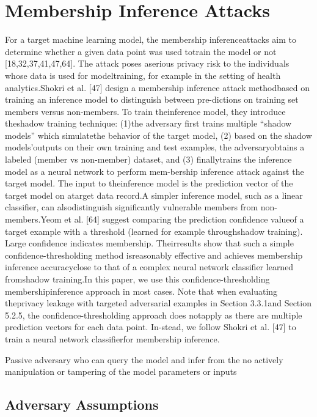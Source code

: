 \section{Membership Inference Attacks}\label{inferenceback}

For a target machine learning model, the membership inferenceattacks aim to determine whether a given data point was used totrain the model or not [18,32,37,41,47,64]. The attack poses aserious privacy risk to the individuals whose data is used for modeltraining, for example in the setting of health analytics.Shokri et al. [47] design a membership inference attack methodbased on training an inference model to distinguish between pre-dictions on training set members versus non-members. To train theinference model, they introduce theshadow training technique: (1)the adversary first trains multiple “shadow models” which simulatethe behavior of the target model, (2) based on the shadow models’outputs on their own training and test examples, the adversaryobtains a labeled (member vs non-member) dataset, and (3) finallytrains the inference model as a neural network to perform mem-bership inference attack against the target model. The input to theinference model is the prediction vector of the target model on atarget data record.A simpler inference model, such as a linear classifier, can alsodistinguish significantly vulnerable members from non-members.Yeom et al. [64] suggest comparing the prediction confidence valueof a target example with a threshold (learned for example throughshadow training). Large confidence indicates membership. Theirresults show that such a simple confidence-thresholding method isreasonably effective and achieves membership inference accuracyclose to that of a complex neural network classifier learned fromshadow training.In this paper, we use this confidence-thresholding membershipinference approach in most cases. Note that when evaluating theprivacy leakage with targeted adversarial examples in Section 3.3.1and Section 5.2.5, the confidence-thresholding approach does notapply as there are multiple prediction vectors for each data point. In-stead, we follow Shokri et al. [47] to train a neural network classifierfor membership inference.

Passive adversary who can query the model and infer from the
no actively manipulation or tampering of the model parameters or inputs

\subsection{Adversary Assumptions}

